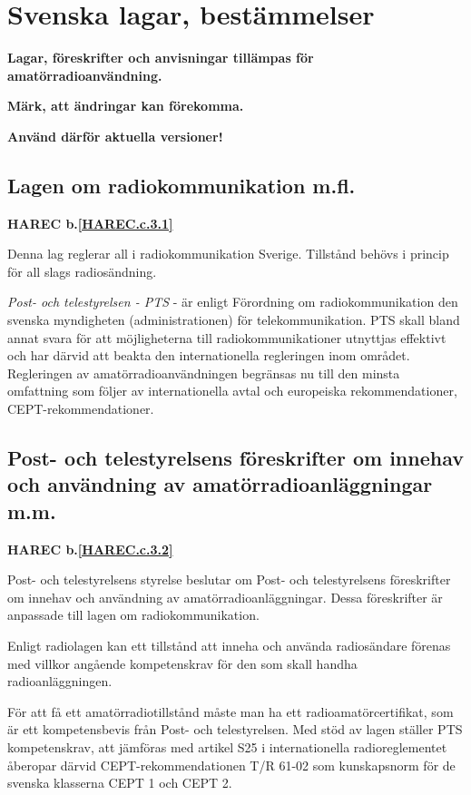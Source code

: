 \section{Svenska lagar, bestämmelser}

\textbf{Lagar, föreskrifter och anvisningar tillämpas för
  amatörradioanvändning.}

\textbf{Märk, att ändringar kan förekomma.}

\textbf{Använd därför aktuella versioner!}


\subsection{Lagen om radiokommunikation m.fl.}
\textbf{
HAREC b.\ref{HAREC.c.3.1}\label{myHAREC.c.3.1}
}

Denna lag reglerar all i radiokommunikation Sverige. Tillstånd behövs
i princip för all slags radiosändning.

\emph{Post- och telestyrelsen - PTS} - är enligt Förordning om
radiokommunikation den svenska myndigheten (administrationen) för
telekommunikation. PTS skall bland annat svara för att möjligheterna
till radiokommunikationer utnyttjas effektivt och har därvid att
beakta den internationella regleringen inom området. Regleringen av
amatörradioanvändningen begränsas nu till den minsta omfattning som
följer av internationella avtal och europeiska rekommendationer,
CEPT-rekommendationer.

\subsection{Post- och telestyrelsens föreskrifter om innehav och
användning av amatörradioanläggningar m.m.}
\textbf{
HAREC b.\ref{HAREC.c.3.2}\label{myHAREC.c.3.2}
}

Post- och telestyrelsens styrelse beslutar om Post- och telestyrelsens
föreskrifter om innehav och användning av amatörradioanläggningar.
Dessa föreskrifter är anpassade till lagen om radiokommunikation.

Enligt radiolagen kan ett tillstånd att inneha och använda
radiosändare förenas med villkor angående kompetenskrav för den som
skall handha radioanläggningen.

För att få ett amatörradiotillstånd måste man ha ett
radioamatörcertifikat, som är ett kompetensbevis från Post- och
telestyrelsen. Med stöd av lagen ställer PTS kompetenskrav, att jämföras
med artikel S25 i internationella radioreglementet åberopar därvid
CEPT-rekommendationen T/R 61-02 som kunskapsnorm för de svenska
klasserna CEPT 1 och CEPT 2.


